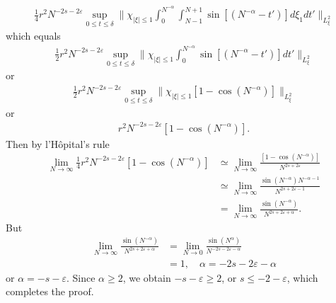 \documentclass[12pt,reqno]{amsart}
\numberwithin{equation}{section}  %
\newcommand{\ee}{\varepsilon}
\begin{document}
%
%
%
%
\begin{equation*}
\begin{split}
  \frac{1}{4} r^{2}N^{-2s - 2\ee} \sup_{0 \le t \le \delta} \|\chi_{| \xi |\le 1} 
  \int_{0}^{N^{-\alpha}} \int_{N-1}^{N+1} \sin[(N^{-\alpha}-t')] d
  \xi_{1} dt' \|_{L^{2}_{\xi}}
\end{split}
\end{equation*}
%
%
which equals
%
%
%
\begin{equation*}
\begin{split}
  \frac{1}{2} r^{2}N^{-2s - 2\ee} \sup_{0 \le t \le \delta} \|\chi_{| \xi |\le 1} 
  \int_{0}^{N^{-\alpha}} \sin[(N^{-\alpha}-t')] dt' \|_{L^{2}_{\xi}}
\end{split}
\end{equation*}
%
%
or
%
\begin{equation*}
\begin{split}
  \frac{1}{2} r^{2}N^{-2s - 2\ee} \sup_{0 \le t \le \delta} \|\chi_{| \xi |\le 1} 
  [1 - \cos(N^{-\alpha})] \|_{L^{2}_{\xi}}
\end{split}
\end{equation*}
%
%
or
%
\begin{equation*}
\begin{split}
r^{2} N^{-2s - 2\ee}  
[1 - \cos(N^{-\alpha})].
\end{split}
\end{equation*}
%
%
Then by l'H\^opital's rule
%
%
\begin{equation*}
\begin{split}
  \lim_{N \to \infty} \frac{1}{4} r^{2} N^{-2s - 2\ee}  
[1 - \cos(N^{-\alpha})]
& \simeq \lim_{N \to \infty} \frac{[1 - \cos(N^{-\alpha})]}{N^{2s + 2\ee}}
\\
& \simeq \lim_{N \to \infty}  \frac{\sin(N^{-\alpha}) N^{-\alpha -1}}{N^{2s+ 2
\ee -1}}
\\
& = \lim_{N \to \infty} \frac{\sin(N^{-\alpha})}{N^{2s + 2\ee + \alpha}}.
\end{split}
\end{equation*}
%
%
But
%
%
\begin{equation*}
\begin{split}
  \lim_{N \to \infty} \frac{\sin(N^{-\alpha})}{N^{2s + 2\ee + \alpha}}
  & = \lim_{N \to 0}\frac{\sin(N^{\alpha})}{N^{-2s - 2 \ee - \alpha}}
  \\
  & = 1, \quad \alpha = -2s - 2\ee - \alpha
\end{split}
\end{equation*}
%
%
or $\alpha = -s -\ee $. Since $\alpha \ge 2$, we obtain
%
%
$-s - \ee \ge 2$, or $s \le -2 - \ee$, which completes the proof.
\qquad \qedsymbol
%
%
\end{document}

